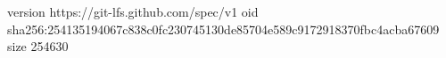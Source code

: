 version https://git-lfs.github.com/spec/v1
oid sha256:254135194067c838c0fc230745130de85704e589c9172918370fbc4acba67609
size 254630
